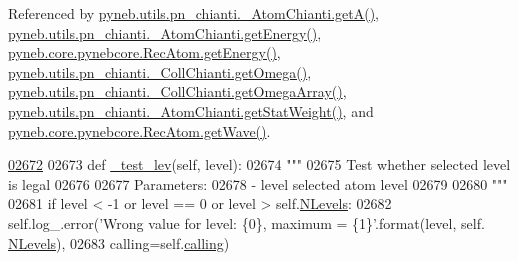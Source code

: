 Referenced by \hyperlink{pn__chianti_8py_source_l00316}{pyneb.\-utils.\-pn\-\_\-chianti.\-\_\-\-Atom\-Chianti.\-get\-A()}, \hyperlink{pn__chianti_8py_source_l00366}{pyneb.\-utils.\-pn\-\_\-chianti.\-\_\-\-Atom\-Chianti.\-get\-Energy()}, \hyperlink{pynebcore_8py_source_l02927}{pyneb.\-core.\-pynebcore.\-Rec\-Atom.\-get\-Energy()}, \hyperlink{pn__chianti_8py_source_l00507}{pyneb.\-utils.\-pn\-\_\-chianti.\-\_\-\-Coll\-Chianti.\-get\-Omega()}, \hyperlink{pn__chianti_8py_source_l00484}{pyneb.\-utils.\-pn\-\_\-chianti.\-\_\-\-Coll\-Chianti.\-get\-Omega\-Array()}, \hyperlink{pn__chianti_8py_source_l00343}{pyneb.\-utils.\-pn\-\_\-chianti.\-\_\-\-Atom\-Chianti.\-get\-Stat\-Weight()}, and \hyperlink{pynebcore_8py_source_l02699}{pyneb.\-core.\-pynebcore.\-Rec\-Atom.\-get\-Wave()}.


\begin{DoxyCode}
\hypertarget{classpyneb_1_1core_1_1pynebcore_1_1_rec_atom_l02672}{}\hyperlink{classpyneb_1_1core_1_1pynebcore_1_1_rec_atom_a573ceb5efc64c479d5b1fe73373bc033}{02672} 
02673     \textcolor{keyword}{def }\hyperlink{classpyneb_1_1core_1_1pynebcore_1_1_rec_atom_a573ceb5efc64c479d5b1fe73373bc033}{\_test\_lev}(self, level):
02674         \textcolor{stringliteral}{"""}
02675 \textcolor{stringliteral}{        Test whether selected level is legal}
02676 \textcolor{stringliteral}{}
02677 \textcolor{stringliteral}{        Parameters:}
02678 \textcolor{stringliteral}{            - level        selected atom level}
02679 \textcolor{stringliteral}{}
02680 \textcolor{stringliteral}{        """}       
02681         \textcolor{keywordflow}{if} level < -1 \textcolor{keywordflow}{or} level == 0 \textcolor{keywordflow}{or} level > self.\hyperlink{classpyneb_1_1core_1_1pynebcore_1_1_rec_atom_a37c93c0fbaad583a1019f5930bc51999}{NLevels}:
02682             self.log\_.error(\textcolor{stringliteral}{'Wrong value for level: \{0\}, maximum = \{1\}'}.format(level, self.
      \hyperlink{classpyneb_1_1core_1_1pynebcore_1_1_rec_atom_a37c93c0fbaad583a1019f5930bc51999}{NLevels}),
02683                             calling=self.\hyperlink{classpyneb_1_1core_1_1pynebcore_1_1_rec_atom_a82ec425ebba32b73a5d9ae52717d47c4}{calling})

\end{DoxyCode}
